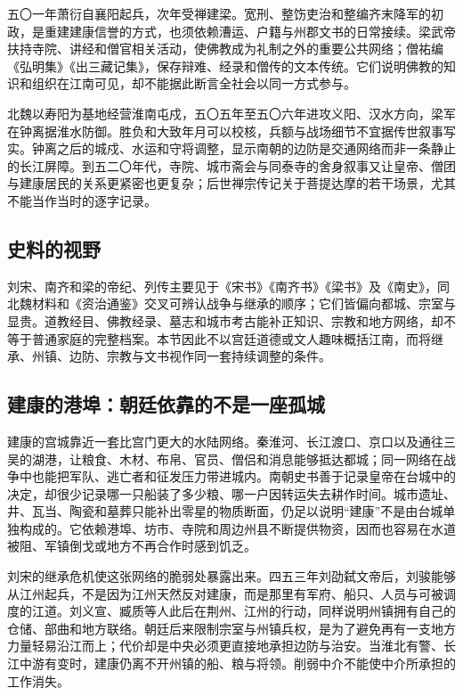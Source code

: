 五〇一年萧衍自襄阳起兵，次年受禅建梁。宽刑、整饬吏治和整编齐末降军的初政，是重建建康信誉的方式，也须依赖漕运、户籍与州郡文书的日常接续。梁武帝扶持寺院、讲经和僧官相关活动，使佛教成为礼制之外的重要公共网络；僧祐编《弘明集》《出三藏记集》，保存辩难、经录和僧传的文本传统。它们说明佛教的知识和组织在江南可见，却不能据此断言全社会以同一方式参与。

北魏以寿阳为基地经营淮南屯戍，五〇五年至五〇六年进攻义阳、汉水方向，梁军在钟离据淮水防御。胜负和大致年月可以校核，兵额与战场细节不宜据传世叙事写实。钟离之后的城戍、水运和守将调整，显示南朝的边防是交通网络而非一条静止的长江屏障。到五二〇年代，寺院、城市斋会与同泰寺的舍身叙事又让皇帝、僧团与建康居民的关系更紧密也更复杂；后世禅宗传记关于菩提达摩的若干场景，尤其不能当作当时的逐字记录。

\subsection{史料的视野}

刘宋、南齐和梁的帝纪、列传主要见于《宋书》《南齐书》《梁书》及《南史》，同北魏材料和《资治通鉴》交叉可辨认战争与继承的顺序；它们皆偏向都城、宗室与显贵。道教经目、佛教经录、墓志和城市考古能补正知识、宗教和地方网络，却不等于普通家庭的完整档案。本节因此不以宫廷道德或文人趣味概括江南，而将继承、州镇、边防、宗教与文书视作同一套持续调整的条件。

\subsection{建康的港埠：朝廷依靠的不是一座孤城}

建康的宫城靠近一套比宫门更大的水陆网络。秦淮河、长江渡口、京口以及通往三吴的湖港，让粮食、木材、布帛、官员、僧侣和消息能够抵达都城；同一网络在战争中也能把军队、逃亡者和征发压力带进城内。南朝史书善于记录皇帝在台城中的决定，却很少记录哪一只船装了多少粮、哪一户因转运失去耕作时间。城市遗址、井、瓦当、陶瓷和墓葬只能补出零星的物质断面，仍足以说明“建康”不是由台城单独构成的。它依赖港埠、坊市、寺院和周边州县不断提供物资，因而也容易在水道被阻、军镇倒戈或地方不再合作时感到饥乏。

刘宋的继承危机使这张网络的脆弱处暴露出来。四五三年刘劭弑文帝后，刘骏能够从江州起兵，不是因为江州天然反对建康，而是那里有军府、船只、人员与可被调度的江道。刘义宣、臧质等人此后在荆州、江州的行动，同样说明州镇拥有自己的仓储、部曲和地方联络。朝廷后来限制宗室与州镇兵权，是为了避免再有一支地方力量轻易沿江而上；代价却是中央必须更直接地承担边防与治安。当淮北有警、长江中游有变时，建康仍离不开州镇的船、粮与将领。削弱中介不能使中介所承担的工作消失。

